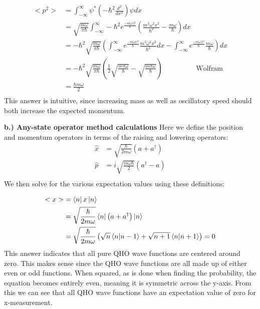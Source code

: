 \documentclass[10pt]{article} %
\begin{document}
\begin{align*}
  <p^2> &= \int_{-\infty}^{\infty} \psi^* \left(-\hbar^2 \frac{d^2}{dx^2}\right)\psi dx\\
  &= \sqrt{\frac{m\omega}{\pi\hbar}}\int_{-\infty}^{\infty} -\hbar^2e^{\frac{-m\omega x^2}{\hbar}}
  \left(\frac{m^2\omega^2x^2}{\hbar^2} - \frac{m\omega}{\hbar}\right)dx\\
  &= -\hbar^2\sqrt{\frac{m\omega}{\pi\hbar}}\left(
  \int_{-\infty}^{\infty} e^{\frac{-m\omega x^2}{\hbar}}\frac{m^2\omega^2x^2}{\hbar^2}dx -
  \int_{-\infty}^{\infty} e^{\frac{-m\omega x^2}{\hbar}}\frac{m\omega}{\hbar}\right)dx\\
  &= -\hbar^2\sqrt{\frac{m\omega}{\pi\hbar}}
  \left(\frac{1}{2}\sqrt{\frac{m\pi\omega}{\hbar}} -
  \sqrt{\frac{m\pi\omega}{\hbar}}\right) \hspace{2cm}\mbox{Wolfram}\\
  &= \frac{\hbar m\omega}{2}\\
\end{align*}
This answer is intuitive, since increasing mass as well as oscillatory speed should both increase
the expected momentum.

\textbf{b.) Any-state operator method calculations}
Here we define the position and momentum operators in terms of the raising and lowering operators:
\begin{align*}
  \hat{x} &= \sqrt{\frac{\hbar}{2m\omega}}\left(a + a^\dagger\right)\\
  \hat{p} &= i\sqrt{\frac{m\omega\hbar}{2}}\left(a^\dagger - a\right)\\
\end{align*}
We then solve for the various expectation values using these definitions:

\begin{align*}
  <x> &= \bra{n}x\ket{n}\\
  &= \sqrt{\frac{\hbar}{2m\omega}}\bra{n}\left(a + a^\dagger\right)\ket{n}\\
  &= \sqrt{\frac{\hbar}{2m\omega}}
  \left(\sqrt{n}\bra{n}\ket{n-1} + \sqrt{n+1}\bra{n}\ket{n+1}\right) = 0\\
\end{align*}
This answer indicates that all pure QHO wave functions are centered around zero. This makes
sense since the QHO wave functions are all made up of either even or odd functions. When squared,
as is done when finding the probability, the equation becomes entirely even, meaning it is
symmetric across the y-axis. From this we can see that all QHO wave functions have an expectation
value of zero for x-measurement.
\end{document}
